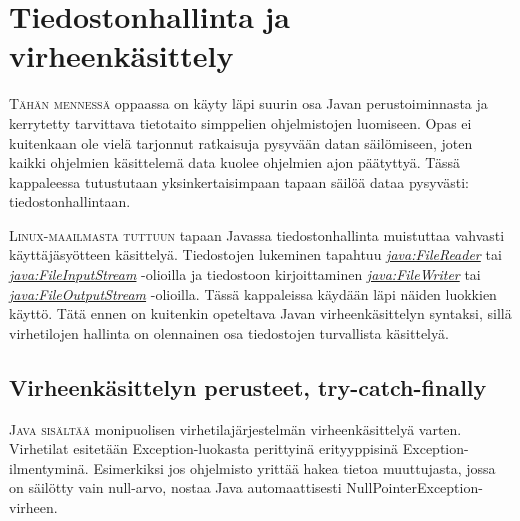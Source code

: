 \documentclass[openany]{book}
\newcommand{\newthought}[1]{\smallskip\textsc{#1}}
\newcommand{\java}[1]{\underline{\gls{java:#1}}}
\newcommand{\newjava}[1]{\textit{\java{#1}}}
\begin{document}

\chapter{Tiedostonhallinta ja virheenkäsittely}
\label{tiedostoista}

\newthought{Tähän mennessä} oppaassa on käyty läpi suurin osa Javan perustoiminnasta ja kerrytetty
tarvittava tietotaito simppelien ohjelmistojen luomiseen. Opas ei kuitenkaan ole vielä tarjonnut
ratkaisuja pysyvään datan säilömiseen, joten kaikki ohjelmien käsittelemä data kuolee ohjelmien
ajon päätyttyä. Tässä kappaleessa tutustutaan yksinkertaisimpaan tapaan säilöä dataa pysyvästi:
tiedostonhallintaan. 

\newthought{Linux-maailmasta tuttuun} tapaan Javassa tiedostonhallinta muistuttaa vahvasti
käyttäjäsyötteen käsittelyä. Tiedostojen lukeminen tapahtuu \newjava{FileReader} tai
\newjava{FileInputStream} -olioilla ja tiedostoon kirjoittaminen \newjava{FileWriter} tai
\newjava{FileOutputStream} -olioilla. Tässä kappaleissa käydään läpi näiden luokkien käyttö. Tätä
ennen on kuitenkin opeteltava Javan virheenkäsittelyn syntaksi, sillä virhetilojen hallinta on
olennainen osa tiedostojen turvallista käsittelyä.


\section{Virheenkäsittelyn perusteet, try-catch-finally}
\label{try-catch}

\newthought{Java sisältää} monipuolisen virhetilajärjestelmän virheenkäsittelyä varten. Virhetilat
esitetään Exception-luokasta perittyinä erityyppisinä Exception-ilmentyminä. Esimerkiksi jos
ohjelmisto yrittää hakea tietoa muuttujasta, jossa on säilötty vain null-arvo, nostaa Java
automaattisesti NullPointerException-virheen. 
\end{document}
